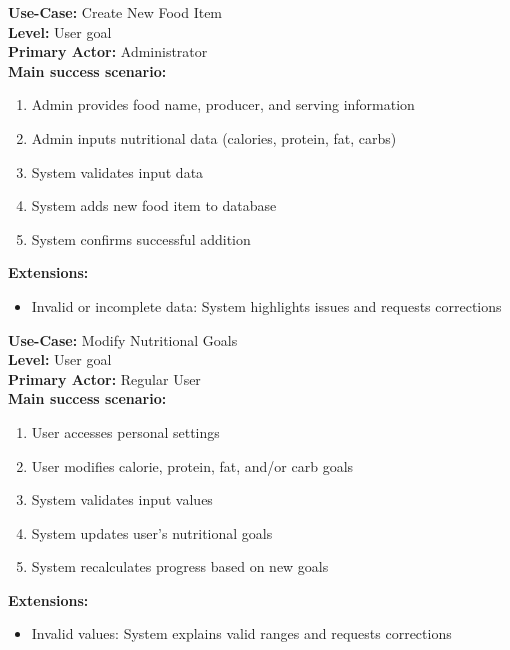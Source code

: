\documentclass[a4paper,10pt]{article}
\begin{document}
        \textbf{Use-Case:} Create New Food Item\\
        \textbf{Level:} User goal\\
        \textbf{Primary Actor:} Administrator\\
        \textbf{Main success scenario:}
        \begin{enumerate}
            \item Admin provides food name, producer, and serving information
            \item Admin inputs nutritional data (calories, protein, fat, carbs)
            \item System validates input data
            \item System adds new food item to database
            \item System confirms successful addition
        \end{enumerate}
        \textbf{Extensions:}
        \begin{itemize}
            \item Invalid or incomplete data: System highlights issues and requests corrections
        \end{itemize}

        \textbf{Use-Case:} Modify Nutritional Goals\\
        \textbf{Level:} User goal\\
        \textbf{Primary Actor:} Regular User\\
        \textbf{Main success scenario:}
        \begin{enumerate}
            \item User accesses personal settings
            \item User modifies calorie, protein, fat, and/or carb goals
            \item System validates input values
            \item System updates user's nutritional goals
            \item System recalculates progress based on new goals
        \end{enumerate}
        \textbf{Extensions:}
        \begin{itemize}
            \item Invalid values: System explains valid ranges and requests corrections
        \end{itemize}

        \newpage
\end{document}
